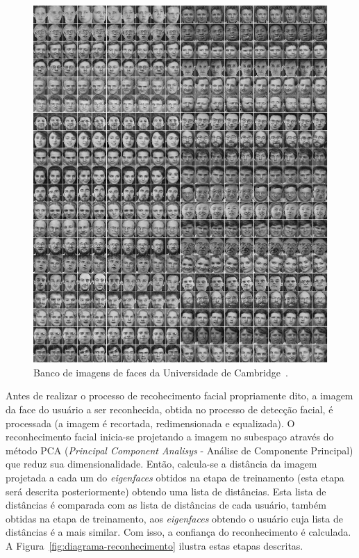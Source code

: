 		\begin{figure}[H]
			\begin{center}
				\includegraphics[scale=0.3]{figuras/4.ProblemaEProposta/cambrigdefacedb.png}
			\end{center}
			\caption{Banco de imagens de faces da Universidade de Cambridge~\cite{cambridgeFaceDb}.}
			\label{fig:cambridgeFaceDb}
		\end{figure}


		Antes de realizar o processo de recohecimento facial propriamente dito, a imagem da face do usuário a ser reconhecida, obtida no processo de detecção facial, é processada (a imagem é recortada, redimensionada e equalizada). O reconhecimento facial inicia-se projetando a imagem no subespaço através do método PCA (\textit{Principal Component Analisys} - Análise de Componente Principal) que reduz sua dimensionalidade. Então, calcula-se a distância da imagem projetada a cada um do \textit{eigenfaces} obtidos na etapa de treinamento (esta etapa será descrita posteriormente) obtendo uma lista de distâncias. Esta lista de distâncias é comparada com as lista de distâncias de cada usuário, também obtidas na etapa de treinamento,  aos \textit{eigenfaces} obtendo o usuário cuja lista de distâncias é a mais similar. Com isso, a confiança do reconhecimento é calculada. A Figura~\ref{fig:diagrama-reconhecimento} ilustra estas etapas descritas.


